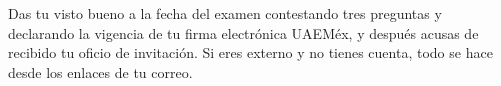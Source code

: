 \documentclass[11pt,a4paper]{article}
\begin{document}
{\small\tableofcontents}
\newpage
\begin{quevasahacer}
Das tu visto bueno a la fecha del examen contestando tres preguntas y declarando la vigencia de tu firma electrónica UAEMéx, y después acusas de recibido tu oficio de invitación. Si eres externo y no tienes cuenta, todo se hace desde los enlaces de tu correo.
\end{quevasahacer}



\end{document}
